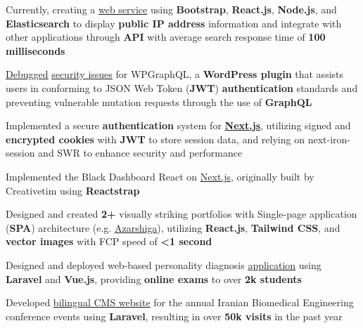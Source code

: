 \documentclass[10pt,A4]{article}
\newcommand{\cvlist}[1] {
  \begin{itemize}\small{#1}\end{itemize}
}
\begin{document}
\begin{paracol}{2}
\begin{rightcolumn}
{\cvlist{
         \item{
                Currently, creating a \href{https://publicipinfo.com}{\underline{web service}} using \textbf{Bootstrap}, \textbf{React.js}, \textbf{Node.js}, and \textbf{Elasticsearch} to display \textbf{public IP address} information and integrate with other applications through \textbf{API} with average search response time of \textbf{100 milliseconds}
          }
          \item{
                \href{https://github.com/wp-graphql/wp-graphql-jwt-authentication/pull/145}{\underline{Debugged}} \href{https://github.com/wp-graphql/wp-graphql-jwt-authentication/issues/144}{\underline{security issues}} for WPGraphQL, a \textbf{WordPress plugin} that assists users in conforming to JSON Web Token (\textbf{JWT}) \textbf{authentication} standards and preventing vulnerable mutation requests through the use of \textbf{GraphQL}
          }\item{
               Implemented a secure \textbf{authentication} system for \href{https://github.com/majhoolsoft/next.js/tree/majhoolsoft/examples/with-iron-session-and-jwt-auth}{\underline{\textbf{Next.js}}}, utilizing signed and \textbf{encrypted cookies} with \textbf{JWT} to store session data, and relying on next-iron-session and SWR to enhance security and performance
          }\item{
                Implemented the Black Dashboard React on \href{https://github.com/majhoolsoft/black-dashboard-nextjs}{\underline{Next.js}}, originally built by Creativetim using \textbf{Reactstrap}
          }\item{
                Designed and created \textbf{2+} visually striking portfolios with Single-page application (\textbf{SPA}) architecture (e.g. \href{https://github.com/majhoolsoft/Next.js-SPA-Portfolio}{\underline{Azarshiga}}), utilizing \textbf{React.js}, \textbf{Tailwind CSS}, and \textbf{vector images} with FCP speed of \textbf{<1 second}
          }\item{
              Designed and deployed web-based personality diagnosis \href{https://github.com/majhoolsoft/Persoulio/tree/2018/MOCKS}{\underline{application}} using \textbf{Laravel} and \textbf{Vue.js}, providing \textbf{online exams} to over \textbf{2k students}
          }
          \item{
                Developed \href{https://icbme.ir/}{\underline{bilingual CMS website}} for the annual Iranian Biomedical Engineering conference events using \textbf{Laravel}, resulting in over \textbf{50k visits} in the past year
}}}
\end{rightcolumn}
\end{paracol}
\end{document}
